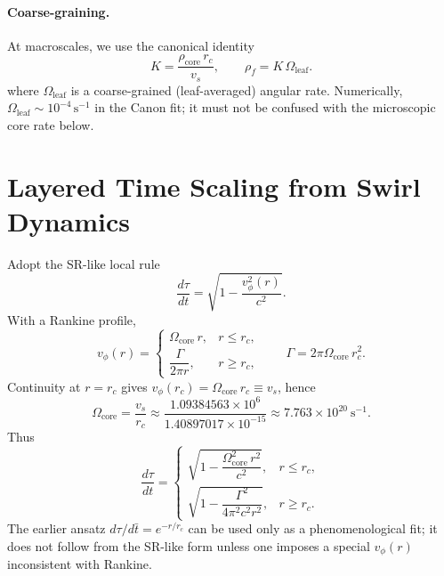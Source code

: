 \documentclass[11pt]{article}
\newcommand{\vscore}{v_s}                                %
\newcommand{\rhoF}{\rho_{\!f}}                           %
\newcommand{\rhoC}{\rho_{\mathrm{core}}} %
\begin{document}
		\paragraph{Coarse-graining.}
		At macroscales, we use the canonical identity
		\[
			K=\frac{\rhoC\,r_c}{\vscore},\qquad \rhoF=K\,\Omega_{\text{leaf}}.
		\]
		where $\Omega_{\text{leaf}}$ is a coarse-grained (leaf-averaged) angular rate. Numerically, $\Omega_{\text{leaf}}\sim 10^{-4}\,\mathrm{s^{-1}}$ in the Canon fit; it must not be confused with the microscopic core rate below.

	\section{Layered Time Scaling from Swirl Dynamics}
		Adopt the SR-like local rule
		\[
			\frac{d\tau}{dt}=\sqrt{1-\frac{v_\phi^{2}(r)}{c^{2}}}.
		\]
		With a Rankine profile,
		\[
			v_\phi(r)=
			\begin{cases}
				\Omega_{\text{core}}\,r, & r\le r_c,\\[4pt]
				\dfrac{\Gamma}{2\pi r}, & r\ge r_c,
			\end{cases}
			\qquad \Gamma=2\pi\Omega_{\text{core}}\,r_c^{2}.
		\]
		Continuity at $r=r_c$ gives $v_\phi(r_c)=\Omega_{\text{core}}\,r_c\equiv \vscore$, hence
		\[
			\Omega_{\text{core}}=\frac{\vscore}{r_c}\approx \frac{1.09384563\times 10^{6}}{1.40897017\times 10^{-15}}
			\approx 7.763\times 10^{20}\ \mathrm{s^{-1}}.
		\]
		Thus
		\[
			\frac{d\tau}{dt}=
			\begin{cases}
				\sqrt{1-\dfrac{\Omega_{\text{core}}^{2}\,r^{2}}{c^{2}}}, & r\le r_c,\\[6pt]
				\sqrt{1-\dfrac{\Gamma^{2}}{4\pi^{2}c^{2}r^{2}}}, & r\ge r_c.
			\end{cases}
		\]
		The earlier ansatz $d\tau/d\bar t=e^{-r/r_c}$ can be used only as a phenomenological fit; it does not follow from the SR-like form unless one imposes a special $v_\phi(r)$ inconsistent with Rankine.

%	
%	
\end{document}
